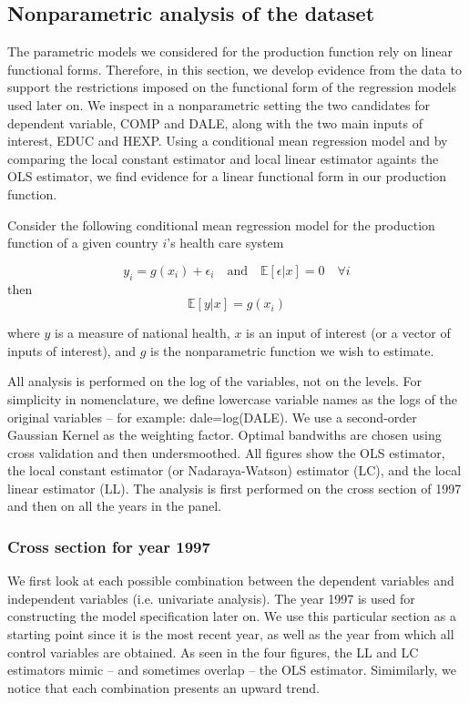 \documentclass[12pt,a4paper]{article}\usepackage[]{graphicx}\usepackage[]{color}
\begin{document}
\subsection{Nonparametric analysis of the dataset}
The parametric models we considered for the production function rely on linear functional forms. Therefore, in this section, we develop evidence from the data to support the restrictions imposed on the functional form of the regression models used later on. We inspect in a nonparametric setting the two candidates for dependent variable, COMP and DALE, along with the two main inputs of interest, EDUC and HEXP. Using a conditional mean regression model and by comparing the local constant estimator and local linear estimator againts the OLS estimator, we find evidence for a linear functional form in our production function. 

Consider the following conditional mean regression model for the production function of a given country $i$'s health care system

$$
y_i = g(x_i) + \epsilon_i \quad \textrm{and} \quad \mathbb{E}[\epsilon|x]=0 \quad \forall i
$$
then
$$
\mathbb{E}[y|x]=g(x_i)
$$

where $y$ is a measure of national health, $x$ is an input of interest (or a vector of inputs of interest), and $g$ is the nonparametric function we wish to estimate.

All analysis is performed on the log of the variables, not on the levels. For simplicity in nomenclature, we define lowercase variable names as the logs of the original variables -- for example: dale=log(DALE). We use a second-order Gaussian Kernel as the weighting factor. Optimal bandwiths are chosen using cross validation and then undersmoothed. All figures show the OLS estimator, the local constant estimator (or Nadaraya-Watson) estimator (LC), and the local linear estimator (LL). The analysis is first performed on the cross section of 1997 and then on all the years in the panel.





\subsubsection{Cross section for year 1997}

We first look at each possible combination between the dependent variables and independent variables (i.e. univariate analysis). The year 1997 is used for constructing the model specification later on. We use this particular section as a starting point since it is the most recent year, as well as the year from which all control variables are obtained. As seen in the four figures, the LL and LC estimators mimic -- and sometimes overlap -- the OLS estimator. Simimilarly, we notice that each combination presents an upward trend.
\end{document}
